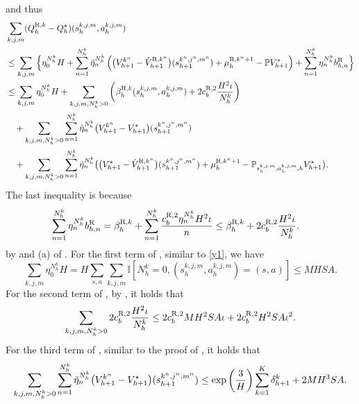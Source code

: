 \documentclass{article}
\newcommand{\R}{\textnormal{R}}
\begin{document}
    and thus
\begin{align}
\label{recur1begin}
        &\sum_{k,j,m}(Q_h^{\R,k} - Q_h^{\star})(s_h^{k,j,m}, a_h^{k,j,m}) \nonumber\\
        &\leq \sum_{k,j,m}\Big\{\eta_0^{N_h^k}H + \sum_{n=1}^{N_h^k} \Tilde{\eta}_n^{N_h^k} \left( \big(V_{h+1}^{k^n}-\hat{V}_{h+1}^{\R,k^n}\big)(s_{h+1}^{k^n,j^n,m^n})   + \mu_h^{\R,k^n+1}- \mathbb{P}V_{h+1}^{\star}\right) + \sum_{n=1}^{N_h^k} \eta_n^{N_h^k}b_{h,n}^{\R}\Big\} \nonumber\\
        &\leq \sum_{k,j,m}\eta_0^{N_h^k}H +\sum_{k,j,m,N_h^k >0}\left(\beta_h^{\R,k}(s_h^{k,j,m}, a_h^{k,j,m})+2c_b^{\R,2}\frac{H^2\iota}{N_h^k}\right) \nonumber\\
        &\quad + \sum_{k,j,m,N_h^k >0}\sum_{n=1}^{N_h^k} \Tilde{\eta}_n^{N_h^k}  \big(V_{h+1}^{k^n}-V_{h+1}^{\star}\big)(s_{h+1}^{k^n,j^n,m^n}) \nonumber\\
        & \quad+ \sum_{k,j,m,N_h^k >0}\sum_{n=1}^{N_h^k} \Tilde{\eta}_n^{N_h^k}\big( \big(V_{h+1}^{\star}-\hat{V}_{h+1}^{\R,k^n}\big)(s_{h+1}^{k^n,j^n,m^n})   + \mu_h^{\R,k^n+1}- \mathbb{P}_{s_h^{k,j,m}, a_h^{k,j,m},h} V_{h+1}^{\star}\big).
    \end{align}
The last inequality is because
\begin{align}
\label{cumbonus}
        \sum_{n=1}^{N_h^k} \eta_n^{N_h^k}b_{h,n}^{\R} =\beta_{h}^{\R,k}+ \sum_{n=1}^{N_h^k}\frac{c_b^{\R,2}\eta_n^{N_h^k}H^2\iota}{n}
        & \leq \beta_{h}^{\R,k} + 2c_b^{\R,2}\frac{H^2\iota}{N_h^k}.
    \end{align}
by  and (a) of . For the first term of , similar to \cref{y1}, we have
\begin{equation}
    \label{recur11}
    \sum_{k,j,m}\eta_0^{N_h^k}H = H\sum_{s,a}\sum_{k,j,m} \mathbb{I}[N_h^k = 0, (s_h^{k,j,m}, a_h^{k,j,m}) = (s,a)] \leq MHSA.
\end{equation}
For the second term of , by , it holds that
\begin{equation}
    \label{recur12}
    \sum_{k,j,m,N_h^k >0} 2c_b^{\R,2}\frac{H^2\iota}{N_h^k} \leq 2c_b^{\R,2}MH^2SA\iota + 2c_b^{\R,2}H^2SA\iota^2.
\end{equation}
For the third term of , similar to the proof of \cite[Equation (25)]{zheng2023federated}, it holds that
\begin{equation}
    \label{recur13}
    \sum_{k,j,m,N_h^k >0}\sum_{n=1}^{N_h^k} \Tilde{\eta}_n^{N_h^k}  \big(V_{h+1}^{k^n}-V_{h+1}^{\star}\big)(s_{h+1}^{k^n,j^n,m^n}) \leq \exp\left(\frac{3}{H}\right)\sum_{k=1}^K \delta_{h+1}^k + 2MH^3SA.
\end{equation}
\end{document}
